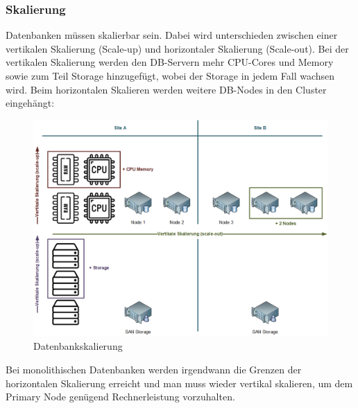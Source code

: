 
\subsubsection{Skalierung}
\begin{flushleft}
    Datenbanken müssen skalierbar sein.
    Dabei wird unterschieden zwischen einer vertikalen Skalierung (Scale-up) und horizontaler Skalierung (Scale-out).
    Bei der vertikalen Skalierung werden den DB-Servern mehr CPU-Cores und Memory sowie zum Teil Storage hinzugefügt, wobei der Storage in jedem Fall wachsen wird.
    Beim horizontalen Skalieren werden weitere DB-Nodes in den Cluster eingehängt\cite{IZSGZLVT}:
    \begin{figure}[H]
        \centering
        \includegraphics[width=1\linewidth]{source/implementation/evaluation/excursus_architecture/Skalierung}
        \caption{Datenbankskalierung}
        \label{fig:Datenbankskalierung}
    \end{figure}

    Bei monolithischen Datenbanken werden irgendwann die Grenzen der horizontalen Skalierung erreicht und man muss wieder vertikal skalieren, um dem Primary Node genügend Rechnerleistung vorzuhalten.
\end{flushleft}